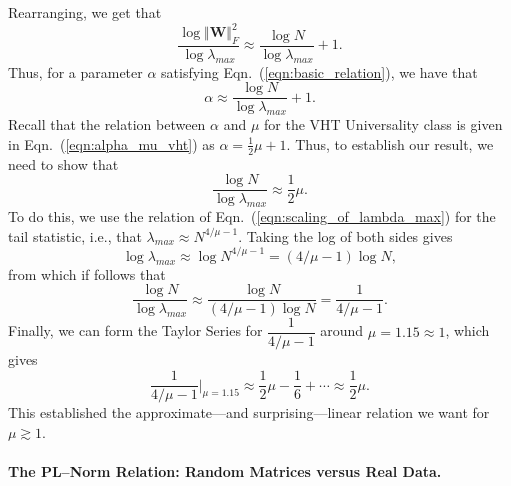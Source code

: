 Rearranging, we get that 
$$
\dfrac{\log\Vert \mathbf{W}\Vert_{F}^{2}}{\log\lambda_{max}}\approx \dfrac{\log N}{\log\lambda_{max}}+1  .
$$
Thus, for a parameter $\alpha$ satisfying Eqn.~(\ref{eqn:basic_relation}), we have that 
$$
\alpha\approx \dfrac{\log N}{\log\lambda_{max}}+1  .
$$
Recall that the relation between $\alpha$ and $\mu$ for the VHT Universality class is given in Eqn.~(\ref{eqn:alpha_mu_vht}) as
$ %
\alpha=\frac{1}{2}\mu+1  .
$ %
Thus, to establish our result, we need to show that
$$
\dfrac{\log N}{\log\lambda_{max}}\approx\dfrac{1}{2}\mu  .
$$
To do this, we use the relation of Eqn.~(\ref{eqn:scaling_of_lambda_max}) for the tail statistic, i.e., that 
$ %
\lambda_{max}\approx N^{4/\mu-1}  .
$ %
Taking the log of both sides gives
$$
\log\lambda_{max}\approx\log N^{4/\mu-1}=(4/\mu-1)\log N  ,
$$
from which if follows that
$$
\dfrac{\log N}{\log\lambda_{max}}\approx\dfrac{\log N}{(4/\mu-1)\log N}=\dfrac{1}{4/\mu-1}   .
$$
Finally, we can form the Taylor Series for $\dfrac{1}{4/\mu-1}$ around $\mu=1.15\approx 1$, which gives 
$$
\dfrac{1}{4/\mu-1}\bigg\rvert_{\mu=1.15}\approx\dfrac{1}{2}\mu-\dfrac{1}{6}+\cdots\approx\dfrac{1}{2}\mu  .
$$
This established the approximate---and surprising---linear relation we want for $\mu \gtrsim 1$. 




\paragraph{The PL--Norm Relation: Random Matrices versus Real Data.}

